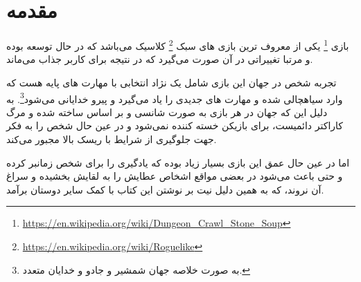 \chapter*{مقدمه}

بازی \footnote{\url{https://en.wikipedia.org/wiki/Dungeon_Crawl_Stone_Soup}} یکی از معروف ترین بازی های سبک \footnote{\url{https://en.wikipedia.org/wiki/Roguelike}} کلاسیک می‌باشد که در حال توسعه بوده و مرتبا تغییراتی در آن صورت می‌گیرد که در نتیجه برای کاربر جذاب می‌ماند.

تجربه شخص در جهان این بازی شامل یک نژاد انتخابی با مهارت های پایه هست که وارد سیاهچالی شده و مهارت های جدیدی را یاد می‌گیرد و پیرو خدایانی می‌شود\footnote{به صورت خلاصه جهان شمشیر و جادو و خدایان متعدد.}. به دلیل این که جهان در هر بازی به صورت شانسی و بر اساس  ساخته شده و مرگ کاراکتر دائمیست، برای بازیکن خسته کننده نمی‌شود و در عین حال شخص را به فکر جهت جلوگیری از شرایط با ریسک بالا مجبور می‌کند. 

اما در عین حال عمق این بازی بسیار زیاد بوده که یادگیری را برای شخص زمانبر کرده و حتی باعث می‌شود در بعضی مواقع اشخاص عطایش را به لقایش بخشیده و سراغ آن نروند، که به همین دلیل نیت بر نوشتن این کتاب با کمک سایر دوستان برآمد.
